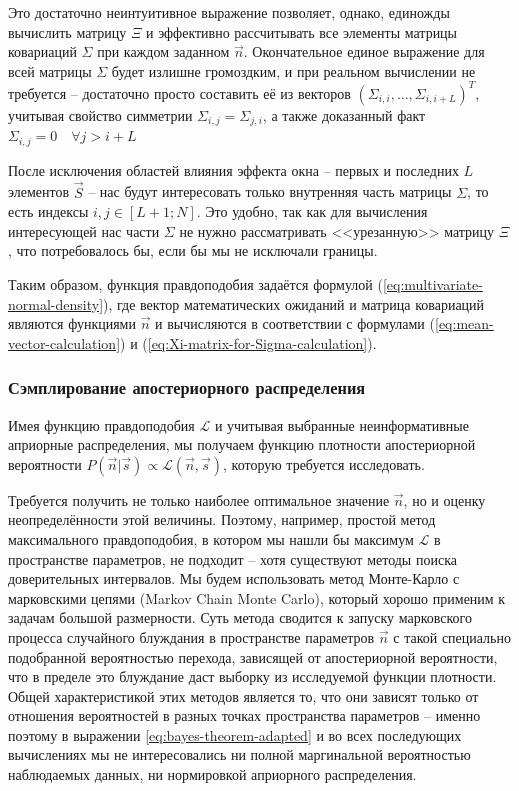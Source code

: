 \documentclass[12pt]{book}
\begin{document}
	Это достаточно неинтуитивное выражение позволяет, однако, единожды вычислить матрицу $\Xi$ и эффективно рассчитывать все элементы матрицы ковариаций $\Sigma$ при каждом заданном $\vec{n}$. Окончательное единое выражение для всей матрицы $\Sigma$ будет излишне громоздким, и при реальном вычислении не требуется -- достаточно просто составить её из векторов $\left( \Sigma_{i, i}, \dots, \Sigma_{i, i+L} \right)^T$, учитывая свойство симметрии $\Sigma_{i, j} = \Sigma_{j, i}$, а также доказанный факт $\Sigma_{i, j} = 0 \quad \forall j > i + L$
	
	После исключения областей влияния эффекта окна -- первых и последних $L$ элементов $\vec{S}$ -- нас будут интересовать только внутренняя часть матрицы $\Sigma$, то есть индексы $i, j \in [L + 1; N]$. Это удобно, так как для вычисления интересующей нас части $\Sigma$ не нужно рассматривать <<урезанную>> матрицу $\Xi$, что потребовалось бы, если бы мы не исключали границы.

	Таким образом, функция правдоподобия задаётся формулой (\ref{eq:multivariate-normal-density}), где вектор математических ожиданий и матрица ковариаций являются функциями $\vec{n}$ и вычисляются в соответствии с формулами (\ref{eq:mean-vector-calculation}) и (\ref{eq:Xi-matrix-for-Sigma-calculation}).
	
	\subsubsection{Сэмплирование апостериорного распределения}
	
	Имея функцию правдоподобия $\mathcal{L}$ и учитывая выбранные неинформативные априорные распределения, мы получаем функцию плотности апостериорной вероятности $P(\vec{n} | \vec{s}) \propto \mathcal{L}(\vec{n}, \vec{s})$, которую требуется исследовать.

	Требуется получить не только наиболее оптимальное значение $\vec{n}$, но и оценку неопределённости этой величины. Поэтому, например, простой метод максимального правдоподобия, в котором мы нашли бы максимум $\mathcal{L}$ в пространстве параметров, не подходит -- хотя существуют методы поиска доверительных интервалов. Мы будем использовать метод Монте-Карло с марковскими цепями (Markov Chain Monte Carlo), который хорошо применим к задачам большой размерности. Суть метода сводится к запуску марковского процесса случайного блуждания в пространстве параметров $\vec{n}$ с такой специально подобранной вероятностью перехода, зависящей от апостериорной вероятности, что в пределе это блуждание даст выборку из исследуемой функции плотности. Общей характеристикой этих методов является то, что они зависят только от отношения вероятностей в разных точках пространства параметров -- именно поэтому в выражении \ref{eq:bayes-theorem-adapted} и во всех последующих вычислениях мы не интересовались ни полной маргинальной вероятностью наблюдаемых данных, ни нормировкой априорного распределения.
	
\end{document}
